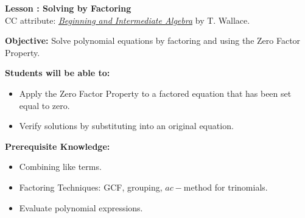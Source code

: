 \documentclass[12pt]{article}
\theoremstyle{definition}
\begin{document}
{\bf \large Lesson : Solving by Factoring}\label{les:solving_by_factoring}
\\ CC attribute: \href{http://www.wallace.ccfaculty.org/book/book.html}{\it{Beginning and Intermediate Algebra}} by T. Wallace. 
\hfill \doclicenseImage[imagewidth=5em]\\
\par
{\bf Objective:} Solve polynomial equations by factoring and using the Zero Factor Property.\\
\par
{\bf Students will be able to:}
\begin{itemize}
	\item Apply the Zero Factor Property to a factored equation that has been set equal to zero.
	\item Verify solutions by substituting into an original equation.
\end{itemize}
{\bf Prerequisite Knowledge:}
\begin{itemize}
	\item Combining like terms.
	\item Factoring Techniques: GCF, grouping, $ac-$method for trinomials.
	\item Evaluate polynomial expressions.
\end{itemize}
\hrulefill
\end{document}
